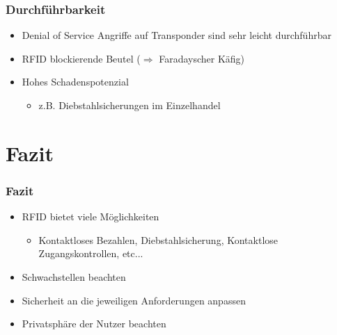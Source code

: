 \documentclass{beamer}
\begin{document}
\begin{frame}
\frametitle{Durchführbarkeit}

\begin{itemize}
	\item Denial of Service Angriffe auf Transponder sind sehr leicht durchführbar
	\item RFID blockierende Beutel ($\Rightarrow$ Faradayscher Käfig)
	\item Hohes Schadenspotenzial
	\begin{itemize}
		\item z.B. Diebstahlsicherungen im Einzelhandel
	\end{itemize}
\end{itemize}
\end{frame}

\section{Fazit}
\begin{frame}
\frametitle{Fazit}

\begin{itemize}
	\item RFID bietet viele Möglichkeiten
	\begin{itemize}
		\item Kontaktloses Bezahlen, Diebstahlsicherung, Kontaktlose Zugangskontrollen, etc...
	\end{itemize}
	\item Schwachstellen beachten
	\item Sicherheit an die jeweiligen Anforderungen anpassen
	\item Privatsphäre der Nutzer beachten
\end{itemize}
\end{frame}
\end{document}
